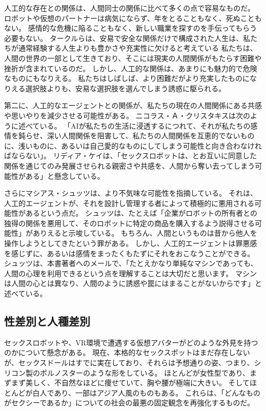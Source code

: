 \documentclass[paper=a4,book,openany]{jlreq} \usepackage{mystyle}
\begin{document}
人工的な存在との関係は、人間同士の関係に比べて多くの点で容易なものだ。
ロボットや仮想のパートナーは病気にならず、年をとることもなく、死ぬこともない。
感情的な危機に陥ることもなく、新しい職業を探すのを手伝ってもらう必要もない。
タークルらは、安易で安全な関係だけで構成された人生は、私たちが通常経験する人生よりも豊かさや充実性に欠けると考えている{\DDASH}
私たちは、人間の世界の一部として生きており、そこには現実の人間関係がもたらす困難や挫折が含まれているのだ。
しかし、人工的な関係は、あまりにも魅力的で危険なものにもなりえる。
私たちはしばしば、より困難だがより充実したものになりえる選択肢よりも、安易な選択肢を選んでしまう誘惑に駆られる。

第二に、人工的なエージェントとの関係が、私たちの現在の人間関係にある共感や思いやりを減少させる可能性がある。
ニコラス・Ａ・クリスタキスは次のように述べている。
「AIが私たちの生活に浸透するにつれて、それが私たちの感情を鈍らせ、深い人間関係を阻害して、私たちの人間関係を互恵的でないものに、浅いものに、あるいは自己愛的なものにしてしまう可能性と向き合わなければならない」\citep{christakis19:_how_ai_will_rewir_us}。
リディア・ケイは、「セックスロボットは、とお互いに同意した関係を通じてのみ発展させられる親密さや共感を、人間から奪い去ってしまう可能性がある」と懸念している\citep{responsible17:_our_sexual_futur_robot}。

さらにマシアス・シュッツは、より不気味な可能性を指摘している。
それは、人工的エージェントが、それを設計し管理する者によって積極的に悪用される可能性があるという点だ。
シュッツは、たとえば「企業がロボットの所有者との独得の関係を悪用して、そのロボットに特定の商品を購入するよう説得させる可能性」がありえると示唆している。
もちろん、人間というものは昔から他人を操作しようとしてきたという罪がある。
しかし、人工的エージェントは罪悪感を感じずに、あるいは感情をまったくもたずにそれをおこなうことができる。
シュッツは、本書著者へのメールで、「たとえかなり単純なマシンであっても、人間の心理を利用できるという点を理解することは大切だと思います。
マシンは人間の心とは異なり、人間のように誘惑や罠にはまることがないからです」と述べている。

\subsection{性差別と人種差別}

セックスロボットや、VR環境で遭遇する仮想アバターがどのような外見を持つのかについて懸念がある。
現在、本格的なセックスボットはまだ存在しないが、セックスドールはすでに実在しており、それらは予想通りの姿、つまり、シリコン製のポルノスターのような形をしている。
ほとんどが女性型であり、まずまず美しく、不自然なほどに痩せていて、胸や腰が極端に大きい。
そしてほとんどが白人であり、一部はアジア人風のものもある。
これらは、「どんなものがセクシーであるか」についての社会の最悪の固定観念を再強化するものだ。
\end{document}
